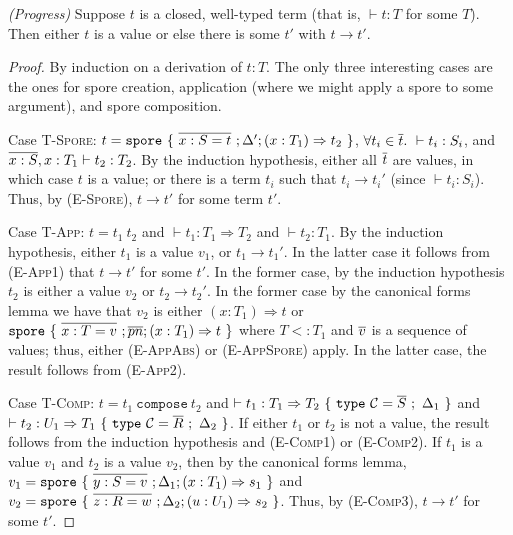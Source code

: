 \begin{theorem}
\emph{(Progress)}
\label{appdx:th:progress}
Suppose $t$ is a closed, well-typed term (that is, $\vdash t : T$ for some $T$).
Then either $t$ is a value or else there is some $t'$ with $t \rightarrow t'$.
\end{theorem}
\begin{proof}
By induction on a derivation of $t : T$. The only three interesting cases are
the ones for spore creation, application (where we might apply a spore to some
argument), and spore composition.

Case \textsc{T-Spore}: $t = \texttt{spore}~\{~\overline{x : S = t}~; \Delta'; (x: T_1) \Rightarrow t_2~\}$, $\forall t_i \in \overline{t}.~\vdash t_i : S_i$, and $\overline{x : S}, x : T_1 \vdash t_2 : T_2$. By the induction hypothesis, either all $\overline{t}$ are values, in which case $t$ is a value; or there is a term $t_i$ such that $t_i \rightarrow t_i'$ (since $\vdash t_i : S_i$). Thus, by (\textsc{E-Spore}), $t \rightarrow t'$ for some term $t'$.

Case \textsc{T-App}: $t = t_1~t_2$ and $\vdash t_1 : T_1 \Rightarrow T_2$ and $\vdash t_2 : T_1$. By the induction hypothesis, either $t_1$ is a value $v_1$, or $t_1 \rightarrow t_1'$. In the latter case it follows from (\textsc{E-App1}) that $t \rightarrow t'$ for some $t'$. In the former case, by the induction hypothesis $t_2$ is either a value $v_2$ or $t_2 \rightarrow t_2'$. In the former case by the canonical forms lemma we have that $v_2$ is either $(x: T_1) \Rightarrow t$ or $\texttt{spore}~\{~\overline{x : T = v}~; \overline{pn} ; (x: T_1) \Rightarrow t~\}$ where $T <: T_1$ and $\overline{v}$ is a sequence of values; thus, either (\textsc{E-AppAbs}) or (\textsc{E-AppSpore}) apply. In the latter case, the result follows from (\textsc{E-App2}).

Case \textsc{T-Comp}: $t = t_1~\texttt{compose}~t_2$ and $\vdash t_1 : T_1 \Rightarrow T_2~\{~\texttt{type}~\mathcal{C} = \overline{S}~;~\Delta_1~\}$ and $\vdash t_2 : U_1 \Rightarrow T_1~\{~\texttt{type}~\mathcal{C} = \overline{R}~;~\Delta_2~\}$. If either $t_1$ or $t_2$ is not a value, the result follows from the induction hypothesis and (\textsc{E-Comp1}) or (\textsc{E-Comp2}). If $t_1$ is a value $v_1$ and $t_2$ is a value $v_2$, then by the canonical forms lemma, $v_1 = \texttt{spore}~\{~\overline{y : S = v}~; \Delta_1; (x: T_1) \Rightarrow s_1~\}$ and $v_2 = \texttt{spore}~\{~\overline{z : R = w}~; \Delta_2; (u: U_1) \Rightarrow s_2~\}$. Thus, by (\textsc{E-Comp3}), $t \rightarrow t'$ for some $t'$.

\end{proof}


